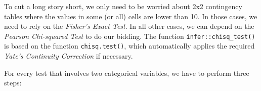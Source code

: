 \documentclass[
  letterpaper,
  DIV=11,
  numbers=noendperiod]{scrreprt}
\begin{document}
\begin{table}

\caption{\label{tbl-statistical-tests-unpaired-cat-variables}Statistical
tests to compare two unpaired categorical variables. Effect sizes are
computed using the \texttt{effectsize} package}


\end{table}%

To cut a long story short, we only need to be worried about 2x2
contingency tables where the values in some (or all) cells are lower
than 10. In those cases, we need to rely on the \emph{Fisher's Exact
Test}. In all other cases, we can depend on the \emph{Pearson
Chi-squared Test} to do our bidding. The function
\texttt{infer::chisq\_test()} is based on the function
\texttt{chisq.test()}, which automatically applies the required
\emph{Yate's Continuity Correction} if necessary.

For every test that involves two categorical variables, we have to
perform three steps:
\end{document}
